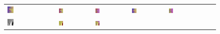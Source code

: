 \begin{figure}[h!]
\begin{tabular}{C{0.14\textwidth}C{0.14\textwidth}C{0.14\textwidth}C{0.14\textwidth}C{0.14\textwidth}C{0.14\textwidth}C{0.14\textwidth}}
		\includegraphics[width=0.14\textwidth]{images/gen/filter_size/p03_03.png_0.50.png} &
		\includegraphics[width=0.14\textwidth]{images/gen/filter_size/p03_03.png_0.75.png} &
		\includegraphics[width=0.14\textwidth]{images/gen/filter_size/p03_03.png_1.00.png} &
		\includegraphics[width=0.14\textwidth]{images/gen/filter_size/p03_03.png_1.25.png} &
		\includegraphics[width=0.14\textwidth]{images/gen/filter_size/p03_03.png_1.50.png} \\
		\includegraphics[width=0.14\textwidth]{images/p03/p03_04.png} &
		\includegraphics[width=0.14\textwidth]{images/gen/filter_size/p03_04.png_0.25.png} &
		\includegraphics[width=0.14\textwidth]{images/gen/filter_size/p03_04.png_0.50.png} &

\end{tabular}
\end{figure}
